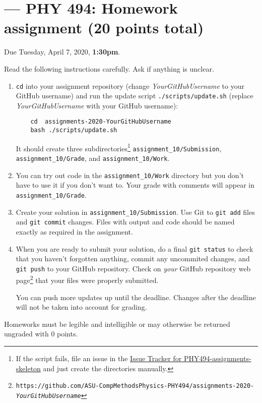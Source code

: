 \documentclass[letterpaper]{scrartcl}
\newcommand{\anumber}{10}
\newcommand{\anum}{\anumber}
\begin{document}

\setcounter{section}{\anumber}
\addtocounter{section}{-1}
\section{ --- PHY 494: Homework assignment (20 points total)}

\noindent Due Tuesday, April 7, 2020, \textbf{1:30pm}.

\noindent
Read the following instructions carefully. Ask if anything is unclear.
\begin{enumerate}
\item \texttt{cd} into your assignment repository (change
  \emph{YourGitHubUsername} to your GitHub username) and run the
  update script \texttt{./scripts/update.sh} (replace
  \emph{YourGitHubUsername} with your GitHub username):
  \begin{verbatim}
    cd  assignments-2020-YourGitHubUsername
    bash ./scripts/update.sh
  \end{verbatim}
  It should create three subdirectories\footnote{If the script fails,
    file an issue in the
    \href{https://github.com/ASU-CompMethodsPhysics-PHY494/PHY494-assignments-skeleton/issues}{Issue
      Tracker for PHY494-assignments-skeleton} and just create the
    directories manually.} \texttt{assignment\_\anum/Submission},
  \texttt{assignment\_\anum/Grade}, and
  \texttt{assignment\_\anum/Work}.
\item You can try out code in the \texttt{assignment\_\anum/Work}
  directory but you don't have to use it if you don't want to. Your
  grade with comments will appear in
  \texttt{assignment\_\anum/Grade}.
\item Create your solution in
  \texttt{assignment\_\anum/Submission}. Use Git to \texttt{git add}
  files and \texttt{git commit} changes. Files with output and code
  should be named exactly as required in the assignment.
\item When you are ready to submit your solution, do a final
  \texttt{git status} to check that you haven't forgotten anything,
  commit any uncommited changes, and \texttt{git push} to your GitHub
  repository. Check on \emph{your} GitHub repository web
  page\footnote{\texttt{https://github.com/ASU-CompMethodsPhysics-PHY494/assignments-2020-\emph{YourGitHubUsername}}}
  that your files were properly submitted.

  You can push more updates up until the deadline. Changes after the
  deadline will not be taken into account for grading.
\end{enumerate}
Homeworks must be legible and intelligible or may otherwise be
returned ungraded with 0 points.
\end{document}
